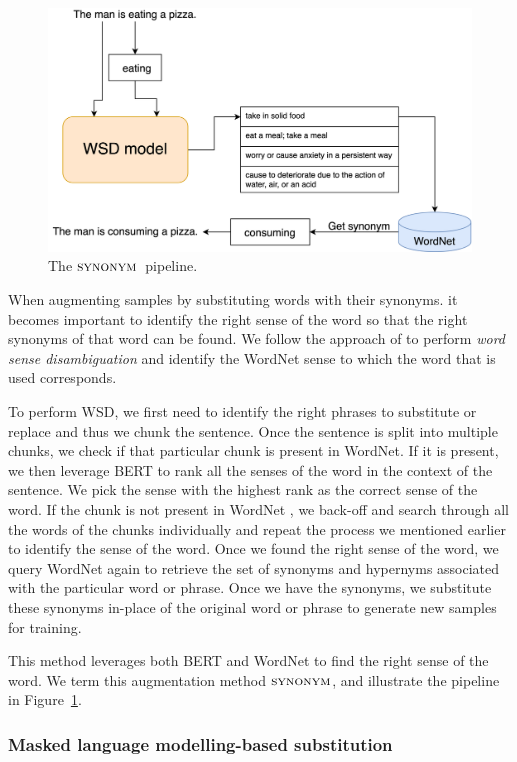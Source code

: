 \documentclass[11pt,a4paper]{article}
\newcommand{\synonym}{$\textsc{synonym}$}
\begin{document}
\begin{figure}
    \centering
    \includegraphics[width=\columnwidth]{figs/synonym.png}
    \caption{The \synonym\ pipeline.}
    \label{fig:wsd}
\end{figure}

When augmenting samples by substituting words with their synonyms. it becomes important to identify the right sense of the word so that the right synonyms of that word can be found. We follow  the approach  of \citet{yap-etal-2020-adapting} to perform \textit{word sense disambiguation} and identify the WordNet sense to which the word that is used corresponds.

To perform WSD, we first need to identify the right phrases to substitute or replace and thus we chunk the sentence. Once the sentence is split into multiple chunks, we check if that particular chunk is present in WordNet. If it is present, we then leverage BERT to rank all the senses of the word in the context of the sentence. We pick the sense with the highest rank as the correct sense of the word. If the chunk is not present in WordNet , we back-off and search through all the words of the chunks individually and repeat the process we mentioned earlier to identify the sense of the word. Once we found the right sense of the word, we query WordNet again to retrieve the set of synonyms and hypernyms associated with the particular word or phrase. Once we have the synonyms, we substitute these synonyms in-place of the original word or phrase to generate new samples for training. 

This method leverages both BERT and WordNet \cite{WordNet} to find the right sense of the word. We term this augmentation method \synonym, and illustrate the pipeline in Figure~\ref{fig:wsd}.

\subsubsection{Masked language modelling-based substitution}
\end{document}
